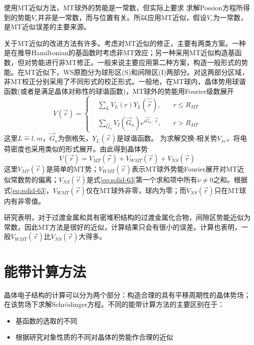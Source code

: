 使用MT近似方法，MT球外的势能是一常数，但实际上要求%
求解Possion方程所得到的势能$V_c$并非是一常数，而与位置有关。所以应用MT近似，假设$V_c$为一常数，是MT近似误差的主要来源。

关于MT近似的改进方法有许多\cite{RPP44-139_1981}。考虑对MT近似的修正，主要有两类方案。一种是在推导Hamiltonian的基函数时考虑非MT效应；另一种采用MT近似构造基函数，但对势能进行非MT修正。一般来说主要应用第二种方案，构造一般形式的势能。在MT近似下，WS原胞分为球形区(S)和间隙区(I)两部分。对这两部分区域，非MT校正分别采用了不同形式的校正形式。一般地，在MT球内，晶体势用球谐函数(或者是满足晶体对称性的球谐函数)，MT球外的势能用Fourier级数展开\cite{PRB13-5362_1976}
\begin{equation}
  V(\vec r)=\left\{
  \begin{aligned}
    &\sum_LV_L(r)Y_L(\hat{\vec r}),\quad &r\leqslant R_{MT}\\
    &\sum_{\vec G_n}V_I(\vec G_n)e^{i\vec G_n\cdot\vec r},&r>R_{MT}
  \end{aligned}\right.
  \label{eq:solid-63}
\end{equation}
这里$L\hat=l,m$，$\vec G_n$为倒格矢，$Y_L(\vec r)$是球谐函数。%
为求解交换-相关势$V_{xc}$，将电荷密度也采用类似的形式展开。由此得到晶体势
\begin{equation}
  V(\vec r)=V_{MT}(\vec r)+V_{WMT}(\vec r)+V_{NS}(\vec r)
  \label{eq:solid-64}
\end{equation}
这里$V_{MT}(\vec r)$是简单的MT势；$V_{WMT}(\vec r)$表示MT球外势能Fourier展开对MT近似常数势的偏离；$V_{NS}(\vec r)$是式\eqref{eq:solid-63}第一个求和项中所有$\nu$$\neq$0之和。根据式\eqref{eq:solid-63}，$V_{WMT}(\vec r)$仅在MT球外非零，球内为零；而$V_{NS}(\vec r)$只在MT球内有非零值。

研究表明，对于过渡金属和具有密堆积结构的过渡金属化合物，间隙区势能近似为常数，因此MT方法是很好的近似，计算结果只会有很小的误差\cite{PR153-931_1967,PRB1-1318_1970,PLA33-414_1970}。计算也表明，一般$V_{WMT}(\vec r)$比$V_{NS}(\vec r)$大得多。

\section{能带计算方法}
晶体电子结构的计算可以分为两个部分：构造合理的具有平移周期性的晶体势场；在该势场下求解Schr\"odinger方程。不同的能带计算方法的主要区别在于：
\begin{itemize}
	\item 基函数的选取的不同
	\item 根据研究对象性质的不同对晶体的势能作合理的近似
\end{itemize}
